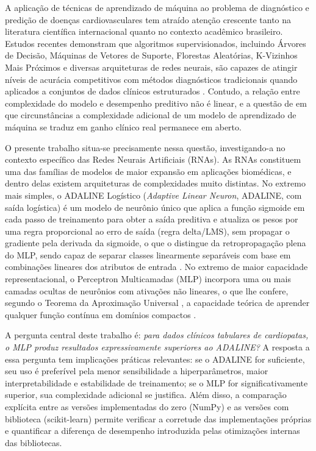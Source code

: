 A aplica\c c\~ao de t\'ecnicas de aprendizado de m\'aquina ao problema de diagn\'ostico e predi\c c\~ao de doen\c cas cardiovasculares tem atra\'ido aten\c c\~ao crescente tanto na literatura cient\'ifica internacional quanto no contexto acad\^emico brasileiro. Estudos recentes demonstram que algoritmos supervisionados, incluindo \'Arvores de Decis\~ao, M\'aquinas de Vetores de Suporte, Florestas Aleat\'orias, K-Vizinhos Mais Pr\'oximos e diversas arquiteturas de redes neurais, s\~ao capazes de atingir n\'iveis de acur\'acia competitivos com m\'etodos diagn\'osticos tradicionais quando aplicados a conjuntos de dados cl\'inicos estruturados \cite{mesquita2020,ravani2024}. Contudo, a rela\c c\~ao entre complexidade do modelo e desempenho preditivo n\~ao \'e linear, e a quest\~ao de em que circunst\^ancias a complexidade adicional de um modelo de aprendizado de m\'aquina se traduz em ganho cl\'inico real permanece em aberto.

O presente trabalho situa-se precisamente nessa quest\~ao, investigando-a no contexto espec\'ifico das Redes Neurais Artificiais (RNAs). As RNAs constituem uma das fam\'ilias de modelos de maior expans\~ao em aplica\c c\~oes biom\'edicas, e dentro delas existem arquiteturas de complexidades muito distintas. No extremo mais simples, o ADALINE Log\'istico (\textit{Adaptive Linear Neuron}, ADALINE, com sa\'ida log\'istica) \'e um modelo de neur\^onio \'unico que aplica a fun\c c\~ao sigmoide em cada passo de treinamento para obter a sa\'ida preditiva e atualiza os pesos por uma regra proporcional ao erro de sa\'ida (regra delta/LMS), sem propagar o gradiente pela derivada da sigmoide, o que o distingue da retropropaga\c c\~ao plena do MLP, sendo capaz de separar classes linearmente separ\'aveis com base em combina\c c\~oes lineares dos atributos de entrada \cite{braga2007}. No extremo de maior capacidade representacional, o Perceptron Multicamadas (MLP) incorpora uma ou mais camadas ocultas de neur\^onios com ativa\c c\~oes n\~ao lineares, o que lhe confere, segundo o Teorema da Aproxima\c c\~ao Universal \cite{cybenko1989,hornik1991}, a capacidade te\'orica de aprender qualquer fun\c c\~ao cont\'inua em dom\'inios compactos \cite{braga2007,silva2016}.

A pergunta central deste trabalho \'e: \textit{para dados cl\'inicos tabulares de cardiopatas, o MLP produz resultados expressivamente superiores ao ADALINE?} A resposta a essa pergunta tem implica\c c\~oes pr\'aticas relevantes: se o ADALINE for suficiente, seu uso \'e prefer\'ivel pela menor sensibilidade a hiperpar\^ametros, maior interpretabilidade e estabilidade de treinamento; se o MLP for significativamente superior, sua complexidade adicional se justifica. Al\'em disso, a compara\c c\~ao expl\'icita entre as vers\~oes implementadas do zero (NumPy) e as vers\~oes com biblioteca (scikit-learn) permite verificar a corretude das implementa\c c\~oes pr\'oprias e quantificar a diferen\c ca de desempenho introduzida pelas otimiza\c c\~oes internas das bibliotecas.

